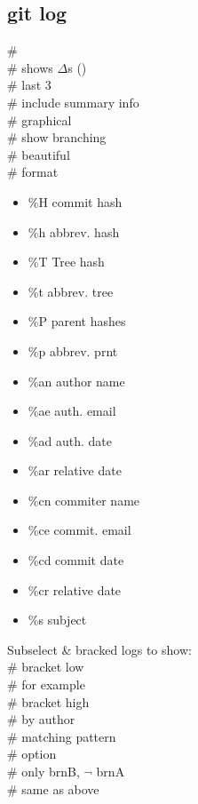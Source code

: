 \subsection*{git log}
 \# \\
 \# shows $\Delta$\textquotesingle s ()\\
 \# last 3 \\
 \# include summary info \\
 \# graphical \\
 \# show branching \\
 \# beautiful \\
 \# format
\begin{multicols}{2}[]
\scriptsize
\begin{itemize}[topsep=0mm]
    \item \%H commit hash
    \item \%h abbrev. hash
    \item \%T Tree hash
    \item \%t abbrev. tree
    \item \%P parent hashes
    \item \%p abbrev. prnt
    \item \%an author name
    \item \%ae auth. email
    \item \%ad auth. date
    \item \%ar relative date
    \item \%cn commiter name
    \item \%ce commit. email
    \item \%cd commit date
    \item \%cr relative date
    \item \%s subject
\end{itemize}
\end{multicols}
Subselect \& bracked logs to show:\\
 \# bracket low \\
 \# for example \\
 \# bracket high \\
 \# by author \\
 \# matching pattern \\
 \#  option \\
 \# only brnB, $\neg$ brnA \\
 \# same as above \\


